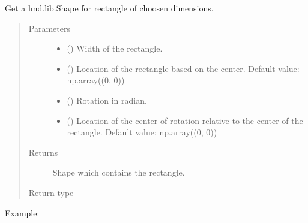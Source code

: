 \documentclass[letterpaper,10pt,english,openany,oneside]{sphinxmanual}
\begin{document}
\begin{fulllineitems}
\label{\detokenize{pages/modules:lmd.tools.rectangle}}
\sphinxAtStartPar
Get a lmd.lib.Shape for rectangle of choosen dimensions.
\begin{quote}\begin{description}
\item[{Parameters}] \leavevmode\begin{itemize}
\item {} 
\sphinxAtStartPar
{} () \textendash{} Width of the rectangle.

\item {} 
\sphinxAtStartPar
{} () \textendash{} Location of the rectangle based on the center. Default value: np.array((0, 0))

\item {} 
\sphinxAtStartPar
{} () \textendash{} Rotation in radian.

\item {} 
\sphinxAtStartPar
{} () \textendash{} Location of the center of rotation relative to the center of the rectangle. Default value: np.array((0, 0))

\end{itemize}

\item[{Returns}] \leavevmode
\sphinxAtStartPar
Shape which contains the rectangle.

\item[{Return type}] \leavevmode
\sphinxAtStartPar
{\hyperref[\detokenize{pages/modules:lmd.lib.Shape}]{}}

\end{description}\end{quote}

\sphinxAtStartPar
Example:

\end{fulllineitems}
\end{document}
